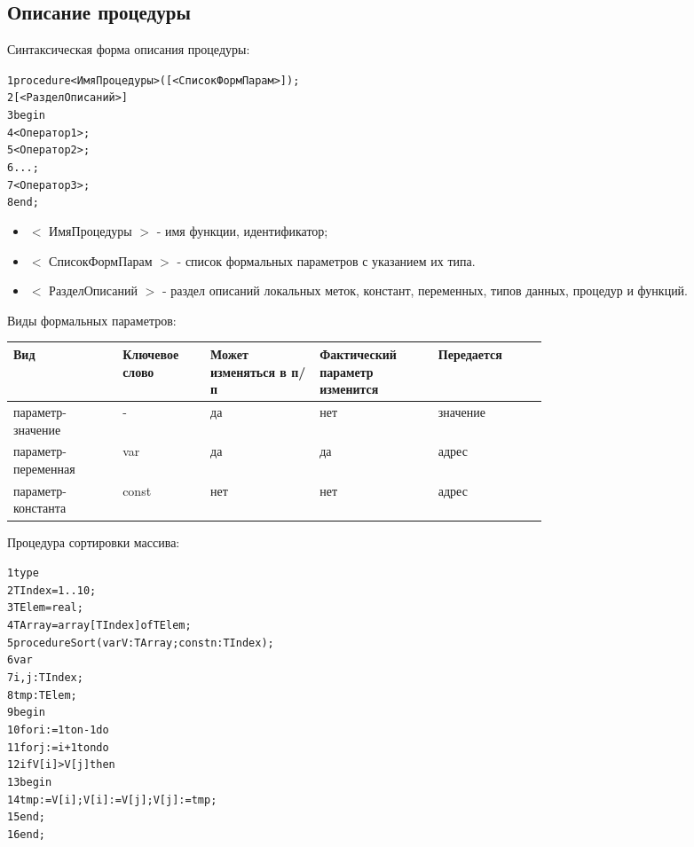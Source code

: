 \documentclass{beamer}
\begin{document}
\subsection{Описание процедуры}
\begin{frame}[fragile]
Синтаксическая форма описания процедуры:
\begin{alltt}
1 procedure <ИмяПроцедуры>([<СписокФормПарам>]);
2     [<РазделОписаний>]
3 begin
4   <Оператор1>;
5   <Оператор2>;
6   ...;
7   <Оператор3>;
8 end;
\end{alltt}
\begin{itemize}
\item $<$ ИмяПроцедуры $>$ - имя функции, идентификатор;
\item $<$ СписокФормПарам $>$ - список формальных параметров с указанием их типа.
\item $<$ РазделОписаний $>$ - раздел описаний локальных меток, констант, переменных, типов данных, процедур и функций.
\end{itemize}
\end{frame}

\begin{frame}
Виды формальных параметров:
\begin{center}
\begin{tabular}{p{0.15\linewidth}||p{0.1\linewidth}|p{0.15\linewidth}|p{0.15\linewidth}|p{0.15\linewidth}}
Вид & Ключевое слово & Может изменяться в п/п & Фактический параметр изменится & Передается\\
\hline параметр-значение & - & да & нет & значение\\
\hline параметр-переменная & var & да & да & адрес\\
\hline параметр-константа & const & нет & нет & адрес\\
\end{tabular}
\end{center}
\end{frame}

\begin{frame}[fragile]
Процедура сортировки массива:
\begin{alltt}
1 type
2   TIndex = 1..10;
3   TElem = real;
4   TArray = array[TIndex] of TElem;
5 procedure Sort(var V:TArray; const n:TIndex); 
6 var
7   i, j: TIndex;
8   tmp:  TElem;
9 begin
10  for i := 1 to n-1 do
11    for j := i + 1 to n do
12      if V[i] > V[j] then
13      begin
14        tmp := V[i]; V[i] := V[j]; V[j] := tmp;
15      end;
16 end;
\end{alltt}
\end{frame}
\end{document}
